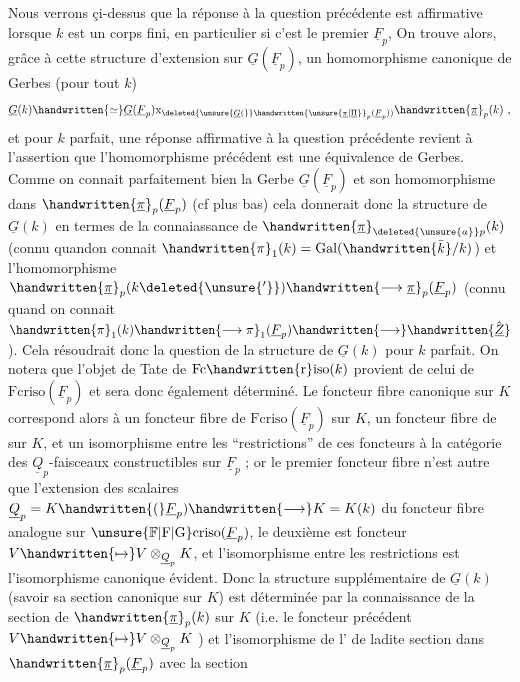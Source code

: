 
 Nous verrons çi-dessus que la réponse à la question précédente est affirmative lorsque $k$ est un corps fini, en particulier si c'est le  premier $\underline{F}_p$, On trouve alors, grâce à cette structure d'extension sur $\underline{G}(\underline{F}_p)$, un homomorphisme canonique de Gerbes (pour tout $k$)
\[
\underline{G}(k)\handwritten{\simeq}\underline{G}(\underline{F}_p)\mathrm{x}_{\deleted{\unsure{\underline{G}(}}\handwritten{\unsure{\underline{\pi}|\underline{\Pi}}}_p(\underline{F}_p))}\handwritten{\underline{\pi}}_p(k)\ ,
\]
et pour $k$ parfait, une réponse affirmative à la question précédente revient à l'assertion que l'homomorphisme précédent est une équivalence de Gerbes. Comme on connait parfaitement bien la Gerbe $\underline{G}(\underline{F}_p)$ et son homomorphisme dans $\handwritten{\underline{\pi}}_p(\underline{F}_p)$ (cf plus bas) cela donnerait donc la structure de $\underline{G}(k)$ en termes de la connaiassance de  $\handwritten{\underline{\pi}}_{\deleted{\unsure{a}}p}(k)$ (connu quand\handwritten{\,}on connait $\handwritten{\pi}_1(k)=\operatorname{Gal}(\handwritten{\bar{k}}/k)$) et  l'homomorphisme $\handwritten{\underline{\pi}}_p(k\deleted{\unsure{'}})\handwritten{\longrightarrow\underline{\pi}}_p(\underline{F}_p)$ (connu quand on connait $\handwritten{\pi}_1(k)\handwritten{\longrightarrow\pi}_1(\underline{F}_p)\handwritten{\longrightarrow}\handwritten{\hat{\underline{Z}}}$). Cela résoudrait donc la question de la structure de $\underline{G}(k)$ pour $k$ parfait. On notera que l'objet de Tate de $\mathrm{Fc}\handwritten{\mathrm{r}}\mathrm{iso}(k)$ provient de celui de $\mathrm{Fcriso}(\underline{F}_p)$ et sera donc également déterminé. Le foncteur fibre canonique sur $K$ correspond alors à un foncteur fibre de $\mathrm{Fcriso}(\underline{F}_p)$ sur $K$, un foncteur fibre de  sur $K$, et un isomorphisme entre les ``restrictions'' de ces foncteurs à la catégorie des $\underline{Q}_p$-faisceaux constructibles sur $\underline{F}_p$ ; or le premier foncteur fibre n'est autre que  l'extension des scalaires $\underline{Q}_p=K\handwritten{(}\underline{F}_p)\handwritten{\longrightarrow}K=K(k)$ du foncteur fibre analogue sur $\unsure{\mathbb{F}|\mathrm{F}|\mathrm{G}}\mathrm{criso}(\underline{F}_p)$, le deuxième est  foncteur  $V\handwritten{\mapsto}V\otimes_{\underline{Q}_p}K$, et l'isomorphisme  entre les restrictions est l'isomorphisme canonique évident. Donc la structure supplémentaire de $\underline{G}(k)$ (savoir sa section  canonique sur $K$) est déterminée par la connaissance de la section de $\handwritten{\underline{\pi}}_p(k)$ sur $K$ (i.e. le foncteur précédent $V\handwritten{\mapsto}V\otimes_{\underline{Q}_p}K$ ) et l'isomorphisme de l' de ladite section dans $\handwritten{\underline{\pi}}_p(\underline{F}_p)$ avec la section 